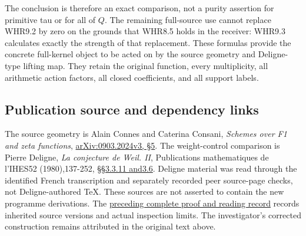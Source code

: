 The conclusion is therefore an exact comparison, not a purity assertion
for primitive tau or for all of \(Q\). The remaining full-source use
cannot replace WHR9.2 by zero on the grounds that WHR8.5 holds in the
receiver: WHR9.3 calculates exactly the strength of that replacement.
These formulas provide the concrete full-kernel object to be acted on by
the source geometry and Deligne-type lifting map. They retain the
original function, every multiplicity, all arithmetic action factors,
all closed coefficients, and all support labels.

\subsection{Publication source and dependency
links}\label{publication-source-and-dependency-links}

The source geometry is Alain Connes and Caterina Consani, \emph{Schemes
over F1 and zeta functions},
\href{https://arxiv.org/abs/0903.2024v3}{arXiv:0903.2024v3, §5}. The
weight-control comparison is Pierre Deligne, \emph{La conjecture de
Weil. II}, Publications mathematiques de l'IHES52 (1980),137-252,
\href{https://www.numdam.org/item/PMIHES_1980__52__137_0/}{§§3.3.11
and3.6}. Deligne material was read through the identified French
transcription and separately recorded peer source-page checks, not
Deligne-authored TeX. These sources are not asserted to contain the new
programme derivations. The
\href{https://github.com/KokunoYumeto/zeta-function-research-reader/blob/36a82ecca98addb8a98b48204e349737856c7223/workbenches/splitzero-tandem/continuations/20260924-cohomology-weight-and-character-lifts/BUILD_AND_REVIEW.md}{preceding
complete proof and reading record} records inherited source versions and
actual inspection limits. The investigator's corrected construction
remains attributed in the original text above.
